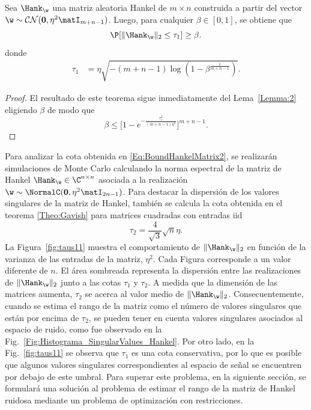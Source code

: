 	\begin{theorem}\label{Th:boundHankelMatrix2}
		Sea $\Hank_{\w}$ una matriz aleatoria Hankel de $m\times n$ construida a partir del vector $\w \sim\mathcal{CN}(\mathbf{0},\eta^2\matI_{m+n-1})$. Luego, para cualquier $\beta\in [0,1]$, se obtiene que
		\[ \P[\|\Hank_{\w}\|_2\le \tau_1]\ge\beta.
		\]
		donde 
		\begin{equation}
			\begin{aligned} 
				\tau_1 & =  \eta\sqrt{-(m+n-1)\log(1-\beta^{\frac{1}{m+n-1}})}. 
			\end{aligned}
			\label{Eq:BoundHankelMatrix2}
		\end{equation}
	\end{theorem}				
	\begin{proof}
		El resultado de este teorema sigue inmediatamente del Lema~\ref{Lemma:2} eligiendo $\beta$ de modo que
		\[\beta \leq \bigg[1-e^{-\frac{\tau_1^2}{(m+n-1)\eta^2}}\bigg]^{m+n-1}. 
		\]
	\end{proof}
	Para analizar la cota obtenida en \eqref{Eq:BoundHankelMatrix2}, se realizarán simulaciones de Monte Carlo calculando la norma espectral de la matriz de Hankel $\Hank_\w\in\C^{n\times n}$ asociada a la realización $\w\sim\NormalC(\mathbf{0},\eta^2\matI_{2n-1})$. Para destacar la dispersión de los valores singulares de la matriz de Hankel, también se calcula la cota obtenida en el teorema \ref{Theo:Gavish} para matrices cuadradas con entradas iid
	\begin{equation}
		\tau_2 = \frac{4}{\sqrt{3}}\sqrt{n}\eta.
		\label{eq:gavish}
	\end{equation}
	La Figura~\ref{fig:taus11} muestra el comportamiento de $\|\Hank_\w\|_2$ en función de la varianza de las entradas de la matriz, $\eta^2$. Cada Figura corresponde a un valor diferente de $n$. El área sombreada representa la dispersión entre las realizaciones de $\|\Hank_\w\|_2$ junto a las cotas $\tau_1$ y $\tau_2$. A medida que la dimensión de las matrices aumenta, $\tau_2$ se acerca al valor medio de $\|\Hank_\w\|_2$. Consecuentemente, cuando se estima el rango de la matriz como el número de valores singulares que están por encima de $\tau_2$, se pueden tener en cuenta valores singulares asociados al espacio de ruido,  como fue observado en  la Fig.~\ref{Fig:Histograma_SingularValues_Hankel}. Por otro lado, en la Fig.~\ref{fig:taus11} se observa que $\tau_1$ es una cota conservativa, por lo que es posible que algunos valores singulares correspondientes al espacio de señal se encuentren por debajo de este umbral. Para superar este problema, en la siguiente sección, se formulará una solución al problema de estimar el rango de la matriz de Hankel ruidosa mediante un problema de optimización con restricciones.
	
